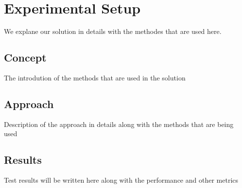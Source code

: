 \chapter{Experimental Setup}
We explane our solution in details with the methodes that are used here.

\section{Concept}
The introdution of the methods that are used in the solution
\section{Approach}
Description of the approach in details along with the methods that are being used
\section{Results}
Test results will be written here along with the performance and other metrics
